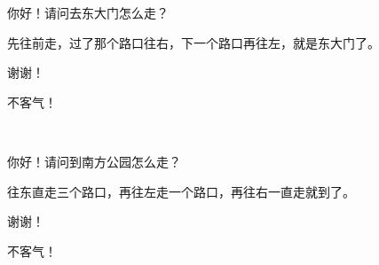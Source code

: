 \documentclass[12pt,UTF-8,openany]{ctexbook}
\begin{document}
\begin{large}
    
    \begin{description}[itemsep=1ex,leftmargin=2.5em,labelwidth=2em]
    
    \item[{\color{script-1-1} 路人}]你好！请问去东大门怎么走？
    
    \item[{\color{script-1-0} 我}]先往前走，过了那个路口往右，下一个路口再往左，就是东大门了。
    
    \item[{\color{script-1-1} 路人}]谢谢！
    
    \item[{\color{script-1-0} 我}]不客气！
    
    \noindent ~
    
    \item[{\color{script-1-1} 路人}]你好！请问到南方公园怎么走？
    
    \item[{\color{script-1-0} 我}]往东直走三个路口，再往左走一个路口，再往右一直走就到了。
    
    \item[{\color{script-1-1} 路人}]谢谢！
    
    \item[{\color{script-1-0} 我}]不客气！
    
    \end{description}
    
    
\end{large}


\clearpage

\begin{center}
    
    
\end{center}


\hanzibox{}\hanzibox{}\hanzibox{}\hanzibox{}\hspace{1em}\hanzibox{}\hanzibox{}\hanzibox{}\hanzibox{}

\hanzibox{}\hanzibox{}\hanzibox{}\hanzibox{}\hspace{1em}\hanzibox{}\hanzibox{}\hanzibox{}\hanzibox{}

\hanzibox{}\hanzibox{}\hanzibox{}\hanzibox{}\hspace{1em}\hanzibox{}\hanzibox{}\hanzibox{}\hanzibox{}
\end{document}

